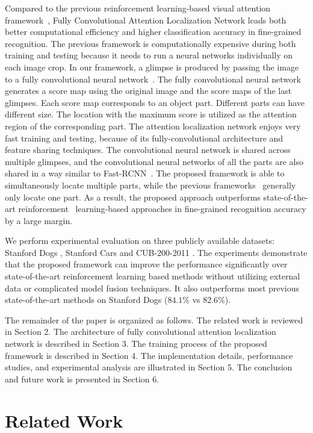 \documentclass[runningheads]{llncs}
\begin{document}
Compared to the previous reinforcement learning-based visual attention framework~\cite{bd1,bd3},
Fully Convolutional Attention Localization Network leads both better computational efficiency and higher classification accuracy in fine-grained recognition.
The previous framework is computationally expensive during both training and testing because it  needs to run a neural networks individually on each image crop.
In our framework, a glimpse is produced by passing the image to a fully convolutional neural network~\cite{bd7,bd8}.
The fully convolutional neural network generates a score map using the original image and the score maps of the last glimpses.
Each score map corresponds to an object part. Different parts can have different size.
The location with the maximum score is utilized as the attention region of the corresponding part.
The attention localization network enjoys very fast training and testing, because of its fully-convolutional architecture and feature sharing techniques.
The convolutional neural network is shared across multiple glimpses, and the convolutional neural networks of all the parts are also shared in a way similar to Fast-RCNN~\cite{girshick2015fast}.
The proposed framework is able to simultaneously locate multiple parts, while the previous frameworks~\cite{bd1,bd3} generally only locate one part.
As a result, the proposed approach outperforms state-of-the-art reinforcement~\cite{bd1,bd3} learning-based approaches in fine-grained recognition accuracy by a large margin.

We perform experimental evaluation on three publicly available datasets: Stanford Dogs \cite{bd4}, Stanford Cars \cite{bd5} and CUB-200-2011 \cite{bd6}.
The experiments demonstrate that the proposed framework can improve the performance significantly over state-of-the-art reinforcement learning based methods without utilizing external data or complicated model fusion techniques.
It also outperforms most previous state-of-the-art methods on Stanford Dogs ($84.1\%$ vs $82.6\%$).

The remainder of the paper is organized as follows. The related work is reviewed in Section 2.
The architecture of fully convolutional attention localization network is described in Section 3.
The training process of the proposed framework is described in Section 4.
The implementation details, performance studies, and experimental analysis are illustrated in Section 5.
The conclusion and future work is presented in Section 6.

\section{Related Work}
\end{document}
